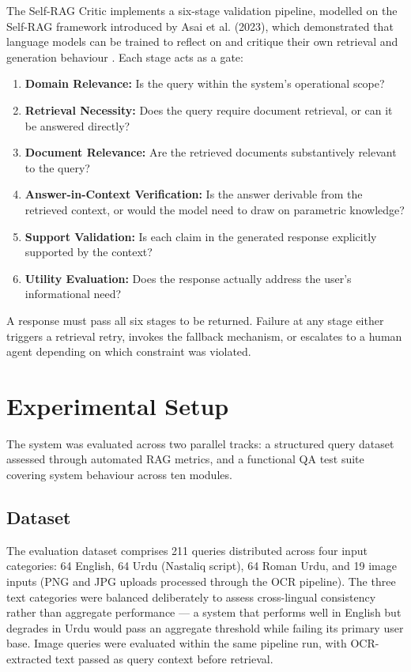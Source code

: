 The Self-RAG Critic implements a six-stage validation pipeline, modelled on the 
Self-RAG framework introduced by Asai et al. (2023), which demonstrated that 
language models can be trained to reflect on and critique their own retrieval and 
generation behaviour \cite{asai2023selfrag}. Each stage acts as a gate:

\begin{enumerate}
    \item \textbf{Domain Relevance:} Is the query within the system's operational 
    scope?
    \item \textbf{Retrieval Necessity:} Does the query require document retrieval, 
    or can it be answered directly?
    \item \textbf{Document Relevance:} Are the retrieved documents substantively 
    relevant to the query?
    \item \textbf{Answer-in-Context Verification:} Is the answer derivable from 
    the retrieved context, or would the model need to draw on parametric 
    knowledge?
    \item \textbf{Support Validation:} Is each claim in the generated response 
    explicitly supported by the context?
    \item \textbf{Utility Evaluation:} Does the response actually address the 
    user's informational need?
\end{enumerate}

A response must pass all six stages to be returned. Failure at any stage either 
triggers a retrieval retry, invokes the fallback mechanism, or escalates to a 
human agent depending on which constraint was violated.

\section{Experimental Setup}

The system was evaluated across two parallel tracks: a structured query dataset 
assessed through automated RAG metrics, and a functional QA test suite covering 
system behaviour across ten modules.

\subsection{Dataset}

The evaluation dataset comprises 211 queries distributed across four input 
categories: 64 English, 64 Urdu (Nastaliq script), 64 Roman Urdu, and 19 image 
inputs (PNG and JPG uploads processed through the OCR pipeline). The three text 
categories were balanced deliberately to assess cross-lingual consistency rather 
than aggregate performance — a system that performs well in English but degrades 
in Urdu would pass an aggregate threshold while failing its primary user base. 
Image queries were evaluated within the same pipeline run, with OCR-extracted 
text passed as query context before retrieval.

